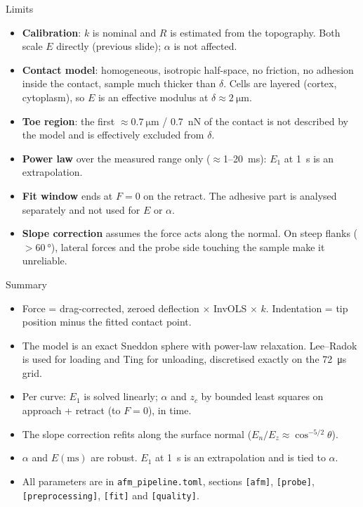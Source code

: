 \documentclass[aspectratio=169,9pt]{beamer}
\begin{document}
\begin{frame}{Limits}
\small
\begin{itemize}
\item \textbf{Calibration}: $k$ is nominal and $R$ is estimated from the topography. Both scale $E$ directly (previous slide); $\alpha$ is not affected.
\item \textbf{Contact model}: homogeneous, isotropic half-space, no friction, no adhesion inside the contact, sample much thicker than $\delta$. Cells are layered (cortex, cytoplasm), so $E$ is an effective modulus at $\delta\approx\SI{2}{\micro\metre}$.
\item \textbf{Toe region}: the first $\approx\SI{0.7}{\micro\metre}$ / \SI{0.7}{\nano\newton} of the contact is not described by the model and is effectively excluded from $\delta$.
\item \textbf{Power law} over the measured range only ($\approx$1--\SI{20}{\milli\second}): $E_1$ at \SI{1}{\second} is an extrapolation.
\item \textbf{Fit window} ends at $F=0$ on the retract. The adhesive part is analysed separately and not used for $E$ or $\alpha$.
\item \textbf{Slope correction} assumes the force acts along the normal. On steep flanks ($>\SI{60}{\degree}$), lateral forces and the probe side touching the sample make it unreliable.
\end{itemize}
\end{frame}

\begin{frame}{Summary}
\begin{itemize}
\item Force = drag-corrected, zeroed deflection $\times$ InvOLS $\times$ $k$. Indentation = tip position minus the fitted contact point.
\item The model is an exact Sneddon sphere with power-law relaxation. Lee--Radok is used for loading and Ting for unloading, discretised exactly on the \SI{72}{\micro\second} grid.
\item Per curve: $E_1$ is solved linearly; $\alpha$ and $z_c$ by bounded least squares on approach + retract (to $F=0$), in time.
\item The slope correction refits along the surface normal ($E_n/E_z\approx\cos^{-5/2}\theta$).
\item $\alpha$ and $E(\text{ms})$ are robust. $E_1$ at \SI{1}{\second} is an extrapolation and is tied to $\alpha$.
\item All parameters are in \texttt{afm\_pipeline.toml}, sections \texttt{[afm]}, \texttt{[probe]}, \texttt{[preprocessing]}, \texttt{[fit]} and \texttt{[quality]}.
\end{itemize}
\end{frame}
\end{document}
